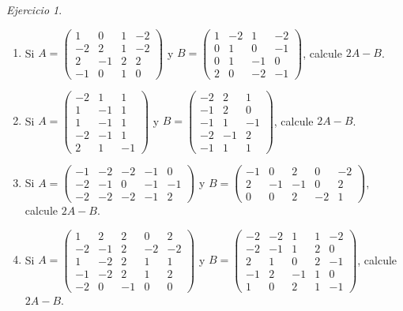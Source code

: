 \documentclass[12pt]{article}
\theoremstyle{remark}
\newtheorem{Ejer}[definicion]{Ejercicio}
\begin{document}
\begin{Ejer}
\begin{enumerate}[start=71]
\item Si $A=\begin{pmatrix}1&0&1&-2\\-2&2&1&-2\\2&-1&2&2\\-1&0&1&0\end{pmatrix}$ y $B=\begin{pmatrix}1&-2&1&-2\\0&1&0&-1\\0&1&-1&0\\2&0&-2&-1\end{pmatrix}$, calcule $2A-B$.

\item Si $A=\begin{pmatrix}-2&1&1\\1&-1&1\\1&-1&1\\-2&-1&1\\2&1&-1\end{pmatrix}$ y $B=\begin{pmatrix}-2&2&1\\-1&2&0\\-1&1&-1\\-2&-1&2\\-1&1&1\end{pmatrix}$, calcule $2A-B$.

\item Si $A=\begin{pmatrix}-1&-2&-2&-1&0\\-2&-1&0&-1&-1\\-2&-2&-2&-1&2\end{pmatrix}$ y $B=\begin{pmatrix}-1&0&2&0&-2\\2&-1&-1&0&2\\0&0&2&-2&1\end{pmatrix}$, calcule $2A-B$.

\item Si $A=\begin{pmatrix}1&2&2&0&2\\-2&-1&2&-2&-2\\1&-2&2&1&1\\-1&-2&2&1&2\\-2&0&-1&0&0\end{pmatrix}$ y $B=\begin{pmatrix}-2&-2&1&1&-2\\-2&-1&1&2&0\\2&1&0&2&-1\\-1&2&-1&1&0\\1&0&2&1&-1\end{pmatrix}$, calcule $2A-B$.

\end{enumerate}
\end{Ejer}
\end{document}
